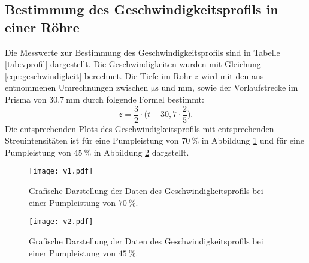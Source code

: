 \FloatBarrier
\subsection{Bestimmung des Geschwindigkeitsprofils in einer Röhre}

Die Messwerte zur Bestimmung des Geschwindigkeitsprofils sind in Tabelle \ref{tab:vprofil} dargestellt.
Die Geschwindigkeiten wurden mit Gleichung \eqref{eqn:geschwindigkeit} berechnet.
Die Tiefe im Rohr $z$ wird mit den aus \cite{sample} entnommenen Umrechnungen zwischen $\si{\micro\second}$ und $\si{\milli\metre}$, sowie der Vorlaufstrecke im Prisma von $\SI{30.7}{\milli\metre}$ durch folgende Formel bestimmt:
\begin{equation}
  z= \frac{3}{2} \cdot \bigl(t-30,7\cdot\frac{2}{5}\bigr) .
\end{equation}
Die entsprechenden Plots des Geschwindigkeitsprofils mit entsprechenden Streuintensitäten ist für eine Pumpleistung von $\SI{70}{\percent}$ in Abbildung \ref{fig:v1} und für eine Pumpleistung von $\SI{45}{\percent}$ in Abbildung \ref{fig:v2} dargstellt.

\begin{table}
  \centering
  \caption{Messdaten und -ergebnisse für das Geschwindigkeitsprofil des $\SI{10}{\milli\metre}$-Rohr.}
  \label{tab:vprofil}
  \noindent{}
 \end{table}

 \begin{figure}
   \centering
   \texttt{[image: v1.pdf]}
   \caption{Grafische Darstellung der Daten des Geschwindigkeitsprofils bei einer Pumpleistung von $\SI{70}{\percent}$.}
   \label{fig:v1}
 \end{figure}

 \begin{figure}
   \centering
   \texttt{[image: v2.pdf]}
   \caption{Grafische Darstellung der Daten des Geschwindigkeitsprofils bei einer Pumpleistung von $\SI{45}{\percent}$.}
   \label{fig:v2}
 \end{figure}
